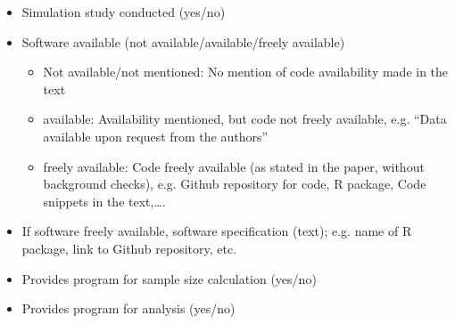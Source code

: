 \noindent 

\begin{itemize}
\item  Simulation study conducted (yes/no)

\item  Software available (not available/available/freely available)

\begin{itemize}
\item  Not available/not mentioned: No mention of code availability made in the text

\item  available: Availability mentioned, but code not freely available, e.g. ``Data available upon request from the authors''

\item  freely available: Code freely available (as stated in the paper, without background checks), e.g. Github repository for code, R package, Code snippets in the text,{\dots}.
\end{itemize}
\end{itemize}

\begin{itemize}
\item  If software freely available, software specification (text); e.g. name of R package, link to Github repository, etc.

\item  Provides program for sample size calculation (yes/no)

\item  Provides program for analysis (yes/no)
\end{itemize}

\noindent 

\noindent 

